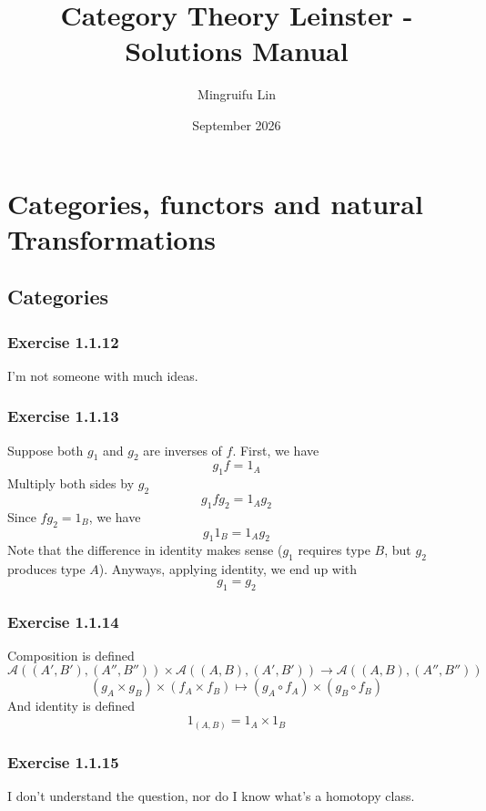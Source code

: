 \documentclass{book}
\title{Category Theory Leinster - Solutions Manual}
\author{Mingruifu Lin}
\date{September 2026}
\begin{document}
\maketitle

\tableofcontents

\chapter{Categories, functors and natural Transformations}

\section{Categories}

\subsection*{Exercise 1.1.12}
I'm not someone with much ideas.

\subsection*{Exercise 1.1.13}
Suppose both $g_1$ and $g_2$ are inverses of $f$. First, we have
$$g_1f = 1_A$$
Multiply both sides by $g_2$
$$g_1fg_2 = 1_A g_2$$
Since $fg_2 = 1_B$, we have
$$g_1 1_B = 1_A g_2$$
Note that the difference in identity makes sense ($g_1$ requires type $B$, but $g_2$ produces type $A$). Anyways, applying identity, we end up with
$$g_1 = g_2$$

\subsection*{Exercise 1.1.14}
Composition is defined
$$\mathscr{A}((A', B'), (A'', B'')) \times \mathscr{A}((A, B), (A', B')) \rightarrow \mathscr{A}((A, B), (A'', B''))$$
$$(g_A \times g_B) \times (f_A \times f_B) \mapsto (g_A \circ f_A) \times (g_B \circ f_B)$$
And identity is defined
$$1_{(A, B)} = 1_A \times 1_B$$

\subsection*{Exercise 1.1.15}
I don't understand the question, nor do I know what's a homotopy class.
\end{document}
